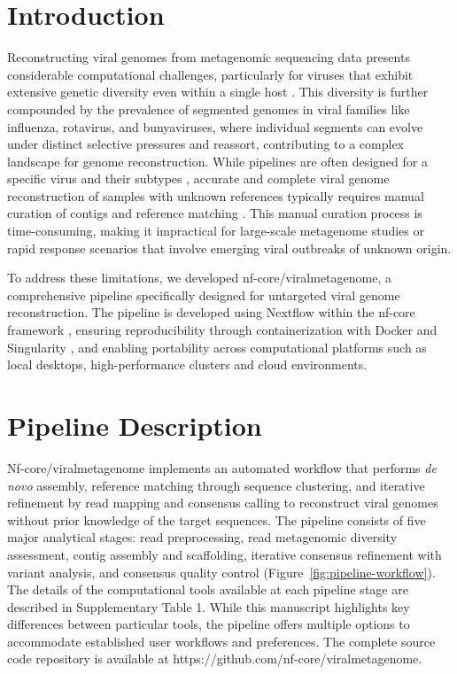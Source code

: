 
\section{Introduction}
Reconstructing viral genomes from metagenomic sequencing data presents considerable computational challenges, particularly for viruses that exhibit extensive genetic diversity even within a single host \cite{Baaijens2017-hw,Deng2021-nl,Meleshko2021-gb}. This diversity is further compounded by the prevalence of segmented genomes in viral families like influenza, rotavirus, and bunyaviruses, where individual segments can evolve under distinct selective pressures and reassort, contributing to a complex landscape for genome reconstruction. While pipelines are often designed for a specific virus and their subtypes \cite{Shepard2016-uh}, accurate and complete viral genome reconstruction of samples with unknown references typically requires manual curation of contigs and reference matching \cite{Tomkins-Tinch2017-qi,De_Vries2021-po,Li2025-uh}. This manual curation process is time-consuming, making it impractical for large-scale metagenome studies or rapid response scenarios that involve emerging viral outbreaks of unknown origin.

To address these limitations, we developed nf-core/viralmetagenome, a comprehensive pipeline specifically designed for untargeted viral genome reconstruction. The pipeline is developed using Nextflow \cite{Di-Tommaso2017-nz} within the nf-core framework \cite{Ewels2020-kk}, ensuring reproducibility through containerization with Docker \cite{Merkel2014-hn} and Singularity \cite{Kurtzer2017-iw}, and enabling portability across computational platforms such as local desktops, high-performance clusters and cloud environments.

\section{Pipeline Description}

Nf-core/viralmetagenome implements an automated workflow that performs \textit{de novo} assembly, reference matching through sequence clustering, and iterative refinement by read mapping and consensus calling to reconstruct viral genomes without prior knowledge of the target sequences. The pipeline consists of five major analytical stages: read preprocessing, read metagenomic diversity assessment, contig assembly and scaffolding, iterative consensus refinement with variant analysis, and consensus quality control (Figure~\ref{fig:pipeline-workflow}). The details of the computational tools available at each pipeline stage are described in Supplementary Table 1. While this manuscript highlights key differences between particular tools, the pipeline offers multiple options to accommodate established user workflows and preferences. The complete source code repository is available at https://github.com/nf-core/viralmetagenome.

